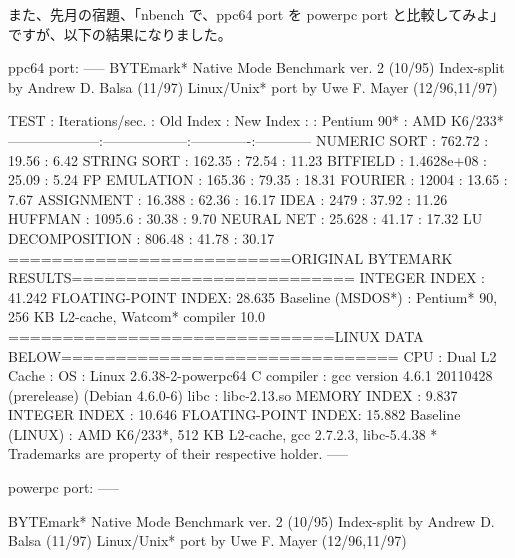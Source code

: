 \documentclass[mingoth,a4paper]{jsarticle}
\begin{document}
また、先月の宿題、「nbench で、ppc64 port を powerpc port と比較してみよ」ですが、以下の結果になりました。

\begin{commandline}
ppc64 port:
-----
BYTEmark* Native Mode Benchmark ver. 2 (10/95)
Index-split by Andrew D. Balsa (11/97)
Linux/Unix* port by Uwe F. Mayer (12/96,11/97)

TEST                : Iterations/sec.  : Old Index   : New Index
                    :                  : Pentium 90* : AMD K6/233*
--------------------:------------------:-------------:------------
NUMERIC SORT        :          762.72  :      19.56  :       6.42
STRING SORT         :          162.35  :      72.54  :      11.23
BITFIELD            :      1.4628e+08  :      25.09  :       5.24
FP EMULATION        :          165.36  :      79.35  :      18.31
FOURIER             :           12004  :      13.65  :       7.67
ASSIGNMENT          :          16.388  :      62.36  :      16.17
IDEA                :            2479  :      37.92  :      11.26
HUFFMAN             :          1095.6  :      30.38  :       9.70
NEURAL NET          :          25.628  :      41.17  :      17.32
LU DECOMPOSITION    :          806.48  :      41.78  :      30.17
==========================ORIGINAL BYTEMARK RESULTS==========================
INTEGER INDEX       : 41.242
FLOATING-POINT INDEX: 28.635
Baseline (MSDOS*)   : Pentium* 90, 256 KB L2-cache, Watcom* compiler 10.0
==============================LINUX DATA BELOW===============================
CPU                 : Dual
L2 Cache            :
OS                  : Linux 2.6.38-2-powerpc64
C compiler          : gcc version 4.6.1 20110428 (prerelease) (Debian 4.6.0-6)
libc                : libc-2.13.so
MEMORY INDEX        : 9.837
INTEGER INDEX       : 10.646
FLOATING-POINT INDEX: 15.882
Baseline (LINUX)    : AMD K6/233*, 512 KB L2-cache, gcc 2.7.2.3, libc-5.4.38
* Trademarks are property of their respective holder.
-----

powerpc port:
-----

BYTEmark* Native Mode Benchmark ver. 2 (10/95)
Index-split by Andrew D. Balsa (11/97)
Linux/Unix* port by Uwe F. Mayer (12/96,11/97)


\end{commandline}
\end{document}
